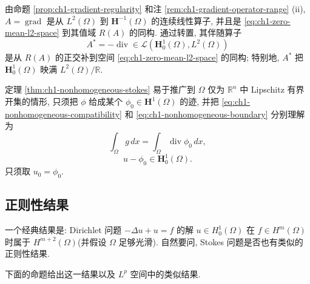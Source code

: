 \begin{Proof}
由命题 \ref{prop:ch1-gradient-regularity} 和注 \ref{rem:ch1-gradient-operator-range} (ii), $A=\operatorname{grad}$ 是从 $L^2(\Omega)$ 到 $\mathbf H^{-1}(\Omega)$ 的连续线性算子, 并且是 \eqref{eq:ch1-zero-mean-l2-space} 到其值域 $R(A)$ 的同构. 通过转置, 其伴随算子
\[
A^*=-\operatorname{div}\in\mathcal L(\mathbf H_0^1(\Omega),L^2(\Omega))
\]
是从 $R(A)$ 的正交补到空间 \eqref{eq:ch1-zero-mean-l2-space} 的同构; 特别地, $A^*$ 把 $\mathbf H_0^1(\Omega)$ 映满 $L^2(\Omega)/\mathbb R$.
\end{Proof}

\begin{Remark}
\label{rem:ch1-nonhomogeneous-lipschitz-extension}
定理 \ref{thm:ch1-nonhomogeneous-stokes} 易于推广到 $\Omega$ 仅为 $\mathbb R^n$ 中 Lipschitz 有界开集的情形, 只须把 $\phi$ 给成某个 $\phi_0\in\mathbf H^1(\Omega)$ 的迹, 并把 \eqref{eq:ch1-nonhomogeneous-compatibility} 和 \eqref{eq:ch1-nonhomogeneous-boundary} 分别理解为
\begin{equation*}
\tag{2.39$'$}
\int_\Omega g\,dx=\int_\Omega\operatorname{div}\phi_0\,dx,
\label{eq:ch1-nonhomogeneous-compatibility-prime}
\end{equation*}
\begin{equation*}
\tag{2.42$'$}
u-\phi_0\in\mathbf H_0^1(\Omega).
\label{eq:ch1-nonhomogeneous-boundary-prime}
\end{equation*}
只须取 $u_0=\phi_0$.
\end{Remark}

\subsection{正则性结果}
\label{subsec:ch1-stokes-regularity}

一个经典结果是: Dirichlet 问题 $-\Delta u+u=f$ 的解 $u\in H_0^1(\Omega)$ 在 $f\in H^m(\Omega)$ 时属于 $H^{m+2}(\Omega)$(并假设 $\Omega$ 足够光滑). 自然要问, Stokes 问题是否也有类似的正则性结果.

下面的命题给出这一结果以及 $L^p$ 空间中的类似结果.

